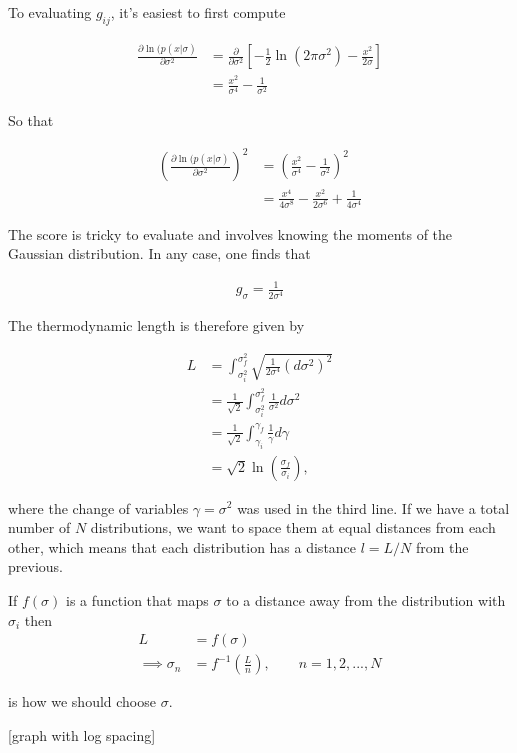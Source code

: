 \documentclass[10pt,a4paper]{article}
\begin{document}
To evaluating $g_{ij}$, it's easiest to first compute

\begin{align*}
\frac{\partial \ln (p(x|\sigma)}{\partial \sigma^2} &= \frac{\partial}{\partial\sigma^2}\left[ -\frac{1}{2}\ln(2\pi\sigma^2) -\frac{x^2}{2\sigma}  \right] \\
&= \frac{x^2}{\sigma^4} - \frac{1}{\sigma^2}
\end{align*}

So that

\begin{align}
\left(\frac{\partial \ln (p(x|\sigma)}{\partial \sigma^2}\right)^2 &= (\frac{x^2}{\sigma^4} - \frac{1}{\sigma^2})^2 \\
&= \frac{x^4}{4\sigma^8} - \frac{x^2}{2\sigma^6} + \frac{1}{4\sigma^4}
\end{align}

The score is tricky to evaluate and involves knowing the moments of the Gaussian distribution. In any case, one finds that

\begin{align}
g_{\sigma} = \frac{1}{2\sigma^4}
\end{align}

The thermodynamic length is therefore given by

\begin{align}
L &= \int_{\sigma_i^2}^{\sigma_f^2} \sqrt{\frac{1}{2\sigma^4} (d\sigma^2)^2} \\
&= \frac{1}{\sqrt{2}}\int_{\sigma_i^2}^{\sigma_f^2} \frac{1}{\sigma^2} d\sigma^2 \\
&= \frac{1}{\sqrt{2}}\int_{\gamma_i}^{\gamma_f} \frac{1}{\gamma} d\gamma \\
&= \sqrt{2}\ln\left(\frac{\sigma_f}{\sigma_i}\right),
\end{align}

where the change of variables $\gamma=\sigma^2$ was used in the third line. If we have a total number of $N$ distributions, we want to space them at equal distances from each other, which means that each distribution has a distance $l = L/N$ from the previous.

If $f(\sigma)$ is a function that maps $\sigma$ to a distance away from the distribution with $\sigma_i$ then
\begin{align*}
L &= f(\sigma) \\
\implies \sigma_n &= f^{-1}\left(\frac{L}{n}\right), \quad \quad n=1,2,...,N
\end{align*}

is how we should choose $\sigma$.

[graph with log spacing]
\end{document}
